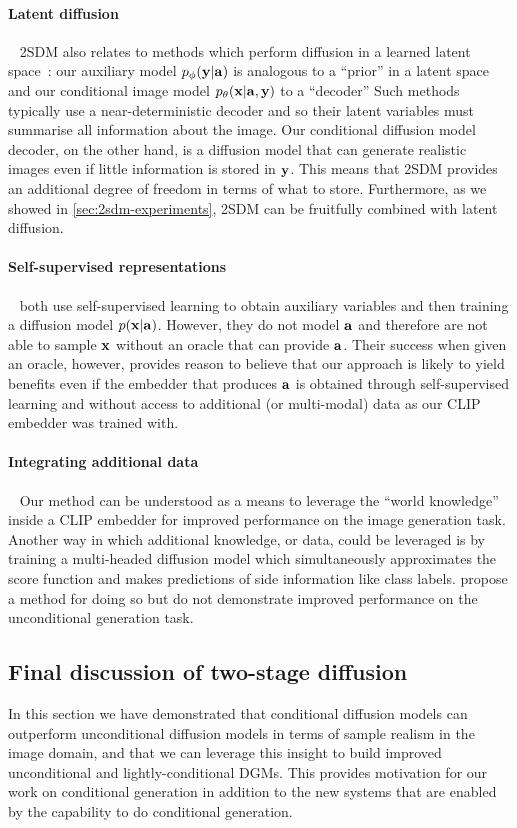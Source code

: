 \paragraph{Latent diffusion}~
2SDM also relates to methods which perform diffusion in a learned latent space~\citep{rombach2022high}: our auxiliary model $p_\phi({\mathbf{y}}|{\mathbf{a}})$ is analogous to a ``prior'' in a latent space and our conditional image model $p_\theta({\mathbf{x}}|{\mathbf{a}},{\mathbf{y}})$ to a ``decoder'' Such methods typically use a near-deterministic decoder and so their latent variables must summarise all information about the image. Our conditional diffusion model decoder, on the other hand, is a diffusion model that can generate realistic images even if little information is stored in ${\mathbf{y}}$. This means that 2SDM provides an additional degree of freedom in terms of what to store. Furthermore, as we showed in \cref{sec:2sdm-experiments}, 2SDM can be fruitfully combined with latent diffusion.

\paragraph{Self-supervised representations}~
\citet{bao2022conditional,hu2022self} both use self-supervised learning to obtain auxiliary variables and then training a diffusion model $p({\mathbf{x}}|{\mathbf{a}})$. However, they do not model ${\mathbf{a}}$ and therefore are not able to sample ${\mathbf{x}}$ without an oracle that can provide ${\mathbf{a}}$. Their success when given an oracle, however, provides reason to believe that our approach is likely to yield benefits even if the embedder that produces ${\mathbf{a}}$ is obtained through self-supervised learning and without access to additional (or multi-modal) data as our CLIP embedder was trained with.

\paragraph{Integrating additional data}~
Our method can be understood as a means to leverage the ``world knowledge'' inside a CLIP embedder for improved performance on the image generation task. Another way in which additional knowledge, or data, could be leveraged is by training a multi-headed diffusion model which simultaneously approximates the score function and makes predictions of side information like class labels. \citet{deja2023learning} propose a method for doing so but do not demonstrate improved performance on the unconditional generation task.

\subsection{Final discussion of two-stage diffusion}
In this section we have demonstrated that conditional diffusion models can outperform unconditional diffusion models in terms of sample realism in the image domain, and that we can leverage this insight to build improved unconditional and lightly-conditional DGMs. This provides motivation for our work on conditional generation in addition to the new systems that are enabled by the capability to do conditional generation. 

